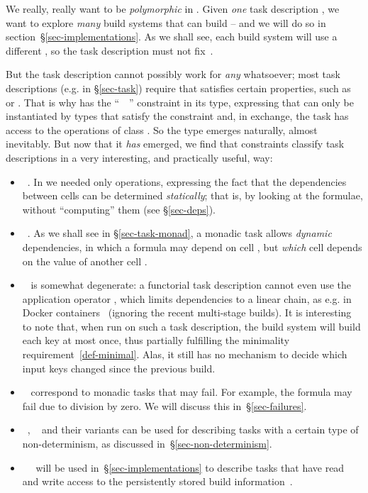 We really, really want  to be \emph{polymorphic} in .
Given \emph{one} task description , we want to explore \emph{many} build
systems that can build  -- and we will do so in
section~\S\ref{sec-implementations}. As we shall see, each build system will use
a different , so the task description must not fix~.

But the task description cannot possibly work for \emph{any}  whatsoever; most task
descriptions (e.g.  in \S\ref{sec-task}) require that 
satisfies certain properties, such as  or . That is
why  has the ``~~\hs{=>}'' constraint in its type,
expressing that  can only be instantiated by types that satisfy the
constraint  and, in exchange, the task has access to the operations of class .
So the type  emerges naturally, almost inevitably.
But now that it \emph{has} emerged, we find that constraints  classify
task descriptions in a very interesting, and practically useful, way:
\begin{itemize}
\item {}~. In  we needed only 
  operations, expressing the fact that the dependencies between cells can be
  determined \emph{statically}; that is, by looking at the formulae, without
  ``computing'' them (see \S\ref{sec-deps}).
\item {}~. As we shall see in \S\ref{sec-task-monad}, a monadic
  task allows \emph{dynamic} dependencies, in which a formula may depend on cell
  , but \emph{which} cell  depends on the value of another cell
  .
\item {}~ is somewhat degenerate: a functorial task
  description cannot even use the application operator \hs{<*>}, which limits
  dependencies to a linear chain, as e.g. in Docker containers~\cite{docker}
  (ignoring the recent multi-stage builds). It
  is interesting to note that, when run on such a task description, the
   build system will build each key at most once, thus partially
  fulfilling the minimality requirement~\ref{def-minimal}. Alas, it still has no
  mechanism to decide which input keys changed since the previous build.
\item {}~ correspond to monadic tasks that may fail. For
  example, the formula  may fail due to division by zero. We will
  discuss this in~\S\ref{sec-failures}.
\item {}~, ~ and their
  variants can be used for describing tasks with a certain type of
  non-determinism, as discussed in~\S\ref{sec-non-determinism}.
\item {}~~ will be used
  in~\S\ref{sec-implementations} to describe tasks that have read and write
  access to the persistently stored build information~.
\end{itemize}

